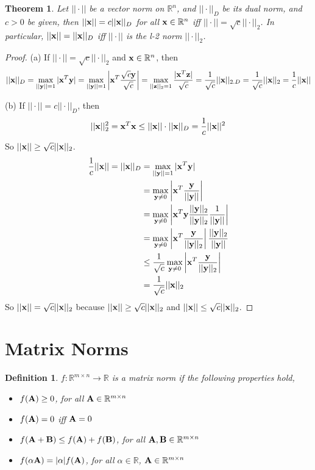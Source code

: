 \documentclass[11pt]{article}
\def\A{{\bf A}}
\def\B{{\bf B}}
\def\x{{\bf x}}
\def\y{{\bf y}}
\def\z{{\bf z}}
\def\BR{{\mathbb R}}
\newtheorem{theorem}{Theorem}[section]
\newtheorem{definition}{Definition}[section]
\begin{document}
\begin{theorem}
	Let $||\cdot||$ be a vector norm on $\BR^n$, and $||\cdot||_D$ be its dual norm, and $c>0$ be given, then $||\x||=c||\x||_D$ for all $\x\in\BR^n$ iff $||\cdot||=\sqrt{c}||\cdot||_2$. In particular, $||\x||=||\x||_D$ iff $||\cdot||$ is the l-2 norm $||\cdot||_2$.
\end{theorem}
\begin{proof}
	(a) If $||\cdot||=\sqrt{c}||\cdot||_2$ and $\x\in\BR^n$, then 
	$$||\x||_D=\max_{||\y||=1}|\x^T\y|=\max_{||\y||=1}\left|\x^T\frac{\sqrt{c}\y}{\sqrt{c}}\right|=\max_{||\z||_2=1}\frac{|\x^T\z|}{\sqrt{c}}=\frac{1}{\sqrt{c}}||\x||_{2.D}=\frac{1}{\sqrt{c}}||\x||_2=\frac{1}{c}||\x||$$

(b) If $||\cdot||=c||\cdot||_D$, then 
$$||\x||_2^2=\x^T\x \le ||\x||\cdot||\x||_D=\frac{1}{c}||\x||^2$$
So $||\x||\ge \sqrt{c}||\x||_2$.
\[
\begin{aligned}
\frac{1}{c}||\x||=||\x||_D&=\max_{||\y||=1}|\x^T\y| \\
&=\max_{\y\ne0}\left|\x^T\frac{\y}{||\y||}\right| \\
&=\max_{\y\ne0}\left|\x^T\y\frac{||\y||_2}{||\y||_2}\frac{1}{||\y||}\right| \\
&=\max_{\y\ne0}\left|\x^T\frac{\y}{||\y||_2}\right| \frac{||\y||_2}{||\y||} \\
&\le \frac{1}{\sqrt{c}}\max_{\y\ne 0}\left|\x^T\frac{\y}{||\y||_2}\right| \\
&=\frac{1}{\sqrt{c}}||\x||_2
\end{aligned}
\]
So $||\x|| = \sqrt{c}||\x||_2$ because $||\x||\ge \sqrt{c}||\x||_2$ and $||\x||\le \sqrt{c}||\x||_2$.

\end{proof}

\section{Matrix Norms}
\begin{definition}
	$f:\BR^{m\times n} \longrightarrow \BR$ is a matrix norm if the following properties hold,
	\begin{itemize}
		\item $f(\A)\ge 0$, for all $\A\in\BR^{m\times n}$
		\item $f(\A)= 0$ iff $\A=0$
		\item $f(\A+\B)\le f(\A)+f(\B)$, for all $\A,\B\in\BR^{m\times n}$  
		\item $f(\alpha\A)=|\alpha|f(\A)$, for all $\alpha\in\BR$, $\A\in\BR^{m\times n}$ 
	\end{itemize}
\end{definition}
\end{document}
